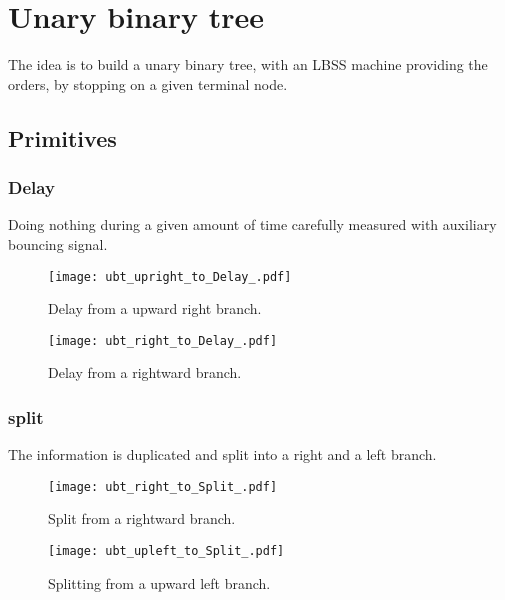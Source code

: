 \section{Unary binary tree}

The idea is to build a unary binary tree, with an LBSS machine providing the orders, by stopping on a given terminal node.

\subsection{Primitives}
\subsubsection{Delay}
Doing nothing during a given amount of time carefully measured with auxiliary bouncing signal.

\begin{figure}[hbt]
	\centering
	\small%
	\texttt{[image: ubt\_upright\_to\_Delay\_.pdf]}%
	\caption{Delay from a upward right branch.}
	\label{fig:delay:upright}
\end{figure}

\begin{figure}[hbt]
	\centering
	\small%
	\texttt{[image: ubt\_right\_to\_Delay\_.pdf]}%
	\caption{Delay from a rightward branch.}
	\label{fig:delay:right}
\end{figure}


\subsubsection{split}
The information is duplicated and split into a right and a left branch.

\begin{figure}[hbt]
	\centering
	\small%
	\texttt{[image: ubt\_right\_to\_Split\_.pdf]}%
	\caption{Split from a rightward branch.}
	\label{fig:split:right}
\end{figure}

\begin{figure}[hbt]
\centering
\small%
%
\texttt{[image: ubt\_upleft\_to\_Split\_.pdf]}%
\caption{Splitting from a upward left branch.}
\label{fig:split:upleft}
\end{figure}


